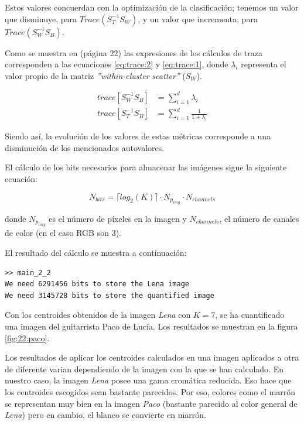 \documentclass[11pt]{article} %
\begin{document}
Estos valores concuerdan con la optimización de la clasificación; tenemos un
valor que disminuye, para $Trace \left( S_T^{-1} S_W \right)$, y un valor que
incrementa, para $Trace \left( S_W^{-1} S_B \right)$.

Como se muestra en \cite{zanibbi_clustering_2010} (página 22) las expresiones de
los cálculos de traza corresponden a las ecuaciones \eqref{eq:trace:2} y
\eqref{eq:trace:1}, donde $\lambda_i$ representa el valor propio de la matriz
\emph{''within-cluster scatter''} ($S_W$).

\begin{align}
    \label{eq:trace:2}
    trace \left[ S_W^{-1} S_B \right] &= \sum_{i=1}^{d} \lambda_i \\
    \label{eq:trace:1}
    trace \left[ S_T^{-1} S_B \right] &= \sum_{i=1}^{d} \frac{1}{1 + \lambda_i}
\end{align}

Siendo así, la evolución de los valores de estas métricas corresponde a una
disminución de los mencionados autovalores.

\bigskip

El cálculo de los bits necesarios para almacenar las imágenes sigue la siguiente
ecuación:

\begin{equation} \label{eq:bits}
    N_{bits} = \lceil log_2 \left( K \right) \rceil \cdot N_{p_{img}} \cdot N_{channels}
\end{equation}

donde $N_{p_{img}}$ es el número de píxeles en la imagen y $N_{channels}$, el
número de canales de color (en el caso RGB son 3).

\bigskip

El resultado del cálculo se muestra a continuación:

\begin{verbatim}
>> main_2_2
We need 6291456 bits to store the Lena image
We need 3145728 bits to store the quantified image
\end{verbatim}

Con los centroides obtenidos de la imagen \emph{Lena} con $K=7$, se ha
cuantificado una imagen del guitarrista Paco de Lucía. Los resultados se
muestran en la figura \ref{fig:22:paco}.

Los resultados de aplicar los centroides calculados en una imagen aplicados a
otra de diferente varian dependiendo de la imagen con la que se han calculado.
En nuestro caso, la imagen \emph{Lena} posee una gama cromática reducida. Eso
hace que los centroides escogidos sean bastante parecidos. Por eso, colores como
el marrón se representan muy bien en la imagen \emph{Paco} (bastante parecido al
color general de \emph{Lena}) pero en cambio, el blanco se convierte en marrón.
\end{document}
